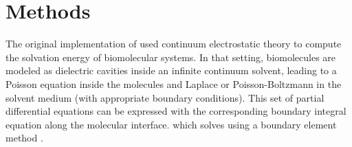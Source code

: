 
\graphicspath{{figs/}}

\chapter{Methods} \label{chap:methods}

The original implementation of \pygbe used continuum electrostatic theory to compute
the solvation energy of biomolecular systems. In that setting, biomolecules are modeled as 
dielectric cavities inside an infinite continuum solvent, 
leading to a Poisson equation inside the molecules and Laplace or Poisson-Boltzmann in the solvent medium (with appropriate boundary conditions).
This set of partial differential equations can be 
expressed with the corresponding boundary integral equation along the molecular interface.
which \pygbe solves using a boundary element method \cite{CooperBardhanBarba2013,CooperClementiBarba2015}.



